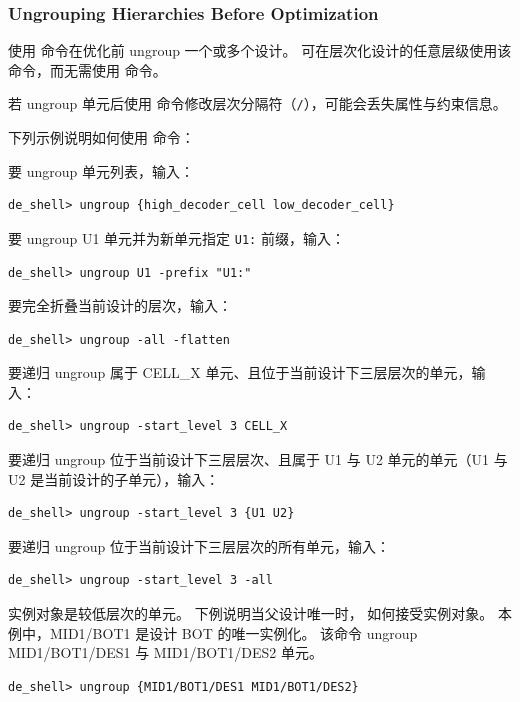 \subsubsection*{Ungrouping Hierarchies Before Optimization}

使用  命令在优化前 ungroup 一个或多个设计。
可在层次化设计的任意层级使用该命令，而无需使用  命令。

\begin{noteBox}
若 ungroup 单元后使用  命令修改层次分隔符（\texttt{/}），可能会丢失属性与约束信息。
\end{noteBox}

下列示例说明如何使用  命令：

要 ungroup 单元列表，输入：
\begin{lstlisting}
de_shell> ungroup {high_decoder_cell low_decoder_cell}
\end{lstlisting}

要 ungroup U1 单元并为新单元指定 \texttt{U1:} 前缀，输入：
\begin{lstlisting}
de_shell> ungroup U1 -prefix "U1:"
\end{lstlisting}

要完全折叠当前设计的层次，输入：
\begin{lstlisting}
de_shell> ungroup -all -flatten
\end{lstlisting}

要递归 ungroup 属于 CELL\_X 单元、且位于当前设计下三层层次的单元，输入：
\begin{lstlisting}
de_shell> ungroup -start_level 3 CELL_X
\end{lstlisting}

要递归 ungroup 位于当前设计下三层层次、且属于 U1 与 U2 单元的单元（U1 与 U2 是当前设计的子单元），输入：
\begin{lstlisting}
de_shell> ungroup -start_level 3 {U1 U2}
\end{lstlisting}

要递归 ungroup 位于当前设计下三层层次的所有单元，输入：
\begin{lstlisting}
de_shell> ungroup -start_level 3 -all
\end{lstlisting}

实例对象是较低层次的单元。
下例说明当父设计唯一时， 如何接受实例对象。
本例中，MID1/BOT1 是设计 BOT 的唯一实例化。
该命令 ungroup MID1/BOT1/DES1 与 MID1/BOT1/DES2 单元。
\begin{lstlisting}
de_shell> ungroup {MID1/BOT1/DES1 MID1/BOT1/DES2}
\end{lstlisting}

